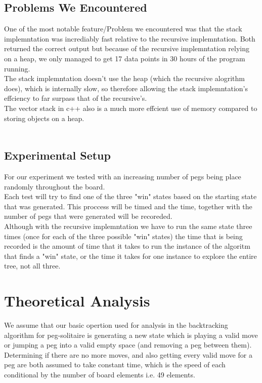 \documentclass[a4paper]{article}
\begin{document}
\subsection{Problems We Encountered}
One of the most notable feature/Problem we encountered was that the stack implemntation was incrediably fast relative to the recursive implemntation. Both returned the correct output but because of the recursive implemntation relying on a heap, we only managed to get 17 data points in 30 hours of the program running. \\
The stack implemntation doesn't use the heap (which the recursive alogrithm does), which is internally slow, so therefore allowing the stack implemntation's effciency to far surpass that of the recursive's.\\
The vector stack in c++ also is a much more effcient use of memory compared to storing objects on a heap.\\\

\subsection{Experimental Setup}
For our experiment we tested with an increasing number of pegs being place randomly throughout the board.\\
Each test will try to find one of the three "win" states based on the  starting state that was generated. This proccess will be timed and the time, together with the number of pegs that were generated will be recoreded.\\
Although with the recursive implemntation we have  to run the same state three times (once for each of the three possible "win" states) the time that is being recorded is the amount of time that it takes to run the instance of the algoritm that finds a  "win" state, or the time it takes for one instance to explore the entire tree, not all three.\\


\section{Theoretical Analysis}
We assume that our basic opertion used for analysis in the backtracking algorithm for peg-solitaire is generating a new state which is playing a valid move or jumping a peg into a valid empty space (and removing a peg between them). Determining if there are no more moves, and also getting every valid move for a peg are both assumed to take constant time, which is the speed of each conditional by the number of board elements i.e. 49 elements.\\\
\end{document}
